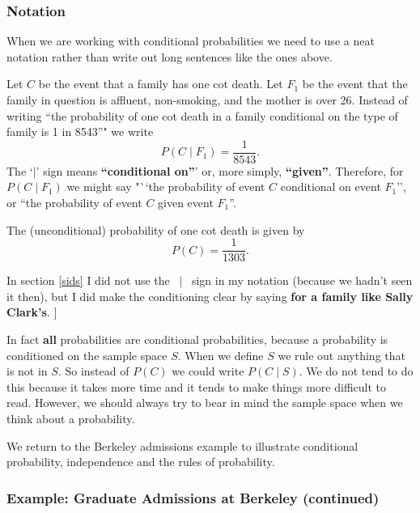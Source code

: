 \documentclass[
  british,
]{book}
\begin{document}
\hypertarget{notation}{%
\subsubsection*{Notation}\label{notation}}

When we are working with conditional probabilities we need to use a neat notation rather than write out long sentences like the ones above.

Let \(C\) be the event that a family has one cot death. Let \(F_1\) be the event that the family in question is affluent, non-smoking, and the mother is over 26. Instead of writing ``the probability of one cot death in a family conditional on the type of family is 1 in 8543''" we write
\[P(C \mid F_1) = \frac{1}{8543}.\]
The `\(\mid\)' sign means \textbf{``conditional on''}' or, more simply, \textbf{``given''}. Therefore, for \(P(C \mid F_1)\) we might say "``the probability of event \(C\) conditional on event \(F_1\)'', or ``the probability of event \(C\) given event \(F_1\)''.

The (unconditional) probability of one cot death is given by
\[P(C) = \frac{1}{1303}.\]

In section \ref{sids} I did not use the \(~\mid~\) sign in my notation (because we hadn't seen it then), but I did make the conditioning clear by saying \textbf{for a family like Sally Clark's}. {]}

In fact \textbf{all} probabilities are conditional probabilities, because a probability is conditioned on the sample space \(S\). When we define \(S\) we rule out anything that is not in \(S\). So instead of \(P(C)\) we could write \(P(C \mid S)\). We do not tend to do this because it takes more time and it tends to make things more difficult to read. However, we should always try to bear in mind the sample space when we think about a probability.

We return to the Berkeley admissions example to illustrate conditional probability, independence and the rules of probability.

\hypertarget{example-graduate-admissions-at-berkeley-continued}{%
\subsubsection*{Example: Graduate Admissions at Berkeley (continued)}\label{example-graduate-admissions-at-berkeley-continued}}
\end{document}
